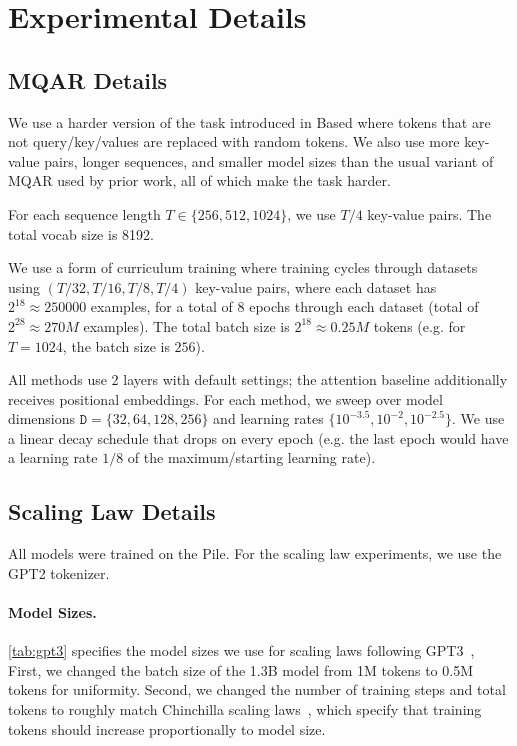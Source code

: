 \section{Experimental Details}
\label{sec:exp-details}

\subsection{MQAR Details}
\label{sec:exp-details:mqar}

We use a harder version of the task introduced in Based \citep{arora2024simple} where tokens that are not query/key/values are replaced with random tokens.
We also use more key-value pairs, longer sequences, and smaller model sizes than the usual variant of MQAR used by prior work, all of which make the task harder.

For each sequence length $T \in \{256, 512, 1024\}$, we use $T/4$ key-value pairs. %
The total vocab size is 8192.

We use a form of curriculum training where training cycles through datasets using $(T/32, T/16, T/8, T/4)$ key-value pairs, where each dataset has $2^{18} \approx 250000$ examples, for a total of $8$ epochs through each dataset (total of $2^{28} \approx 270M$ examples).
The total batch size is $2^{18} \approx 0.25M$ tokens (e.g. for $T=1024$, the batch size is $256$).

All methods use $2$ layers with default settings; the attention baseline additionally receives positional embeddings.
For each method, we sweep over model dimensions $\mathtt{D} = \{32, 64, 128, 256\}$ and learning rates $\{10^{-3.5}, 10^{-2}, 10^{-2.5}\}$.
We use a linear decay schedule that drops on every epoch (e.g. the last epoch would have a learning rate $1/8$ of the maximum/starting learning rate).

\subsection{Scaling Law Details}
\label{sec:exp-details:lm:scaling}

All models were trained on the Pile.
For the scaling law experiments, we use the GPT2 tokenizer.

\paragraph{Model Sizes.}

\cref{tab:gpt3} specifies the model sizes we use for scaling laws following GPT3~\citep{brown2020language},
First, we changed the batch size of the 1.3B model from 1M tokens to 0.5M tokens
for uniformity.
Second, we changed the number of training steps and total tokens to roughly match Chinchilla scaling laws~\citep{hoffmann2022empirical}, which specify that training tokens should increase proportionally to model size.


